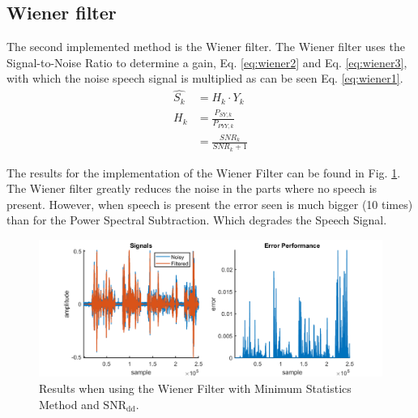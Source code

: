 \subsection{Wiener filter}
The second implemented method is the Wiener filter. The Wiener filter uses the Signal-to-Noise Ratio to determine a gain, Eq. \ref{eq:wiener2} and Eq. \ref{eq:wiener3}, with which the noise speech signal is multiplied as can be seen Eq. \ref{eq:wiener1}.
\begin{align}
  \hat{S_{k}} &= H_{k} \cdot Y_{k}
  \label{eq:wiener1} \\
  H_{k} &= \frac{P_{SY,k}}{P_{PYY,k}}
  \label{eq:wiener2} \\
  &= \frac{SNR_{k}}{SNR_{k}+1}
  \label{eq:wiener3}
\end{align}

The results for the implementation of the Wiener Filter can be found in Fig. \ref{fig:Wiener}. The Wiener filter greatly reduces the noise in the parts where no speech is present. However, when speech is present the error seen is much bigger (10 times) than for the Power Spectral Subtraction. Which degrades the Speech Signal.
\begin{figure}[h]
	\centering
	\includegraphics[width=\textwidth]{images/wiener.png}
	\caption{Results when using the Wiener Filter with Minimum Statistics Method and $\text{SNR}_{\text{dd}}$.}
	\label{fig:Wiener}
\end{figure}

